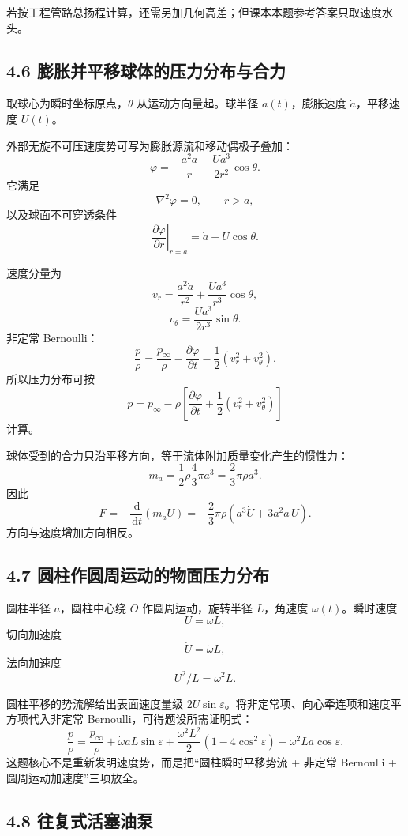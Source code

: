 \documentclass[UTF8,zihao=-4]{ctexart}
\newcommand{\dd}{\,\mathrm d}
\begin{document}
若按工程管路总扬程计算，还需另加几何高差；但课本本题参考答案只取速度水头。

\subsection*{4.6 膨胀并平移球体的压力分布与合力}

取球心为瞬时坐标原点，\(\theta\) 从运动方向量起。球半径 \(a(t)\)，膨胀速度 \(\dot a\)，平移速度 \(U(t)\)。

外部无旋不可压速度势可写为膨胀源流和移动偶极子叠加：
\[
\boxed{
\varphi
=-\frac{a^2\dot a}{r}
-\frac{U a^3}{2r^2}\cos\theta.}
\]
它满足
\[
\nabla^2\varphi=0,\qquad r>a,
\]
以及球面不可穿透条件
\[
\left.\frac{\partial\varphi}{\partial r}\right|_{r=a}
=\dot a+U\cos\theta.
\]

速度分量为
\[
v_r=\frac{a^2\dot a}{r^2}
+\frac{U a^3}{r^3}\cos\theta,
\]
\[
v_\theta=\frac{Ua^3}{2r^3}\sin\theta.
\]
非定常 Bernoulli：
\[
\frac{p}{\rho}
=\frac{p_\infty}{\rho}
-\frac{\partial\varphi}{\partial t}
-\frac12(v_r^2+v_\theta^2).
\]
所以压力分布可按
\[
\boxed{
p=p_\infty-\rho\left[
\frac{\partial\varphi}{\partial t}
+\frac12(v_r^2+v_\theta^2)\right]}
\]
计算。

球体受到的合力只沿平移方向，等于流体附加质量变化产生的惯性力：
\[
m_a=\frac12\rho\frac{4}{3}\pi a^3
=\frac23\pi\rho a^3.
\]
因此
\[
\boxed{
F=-\frac{\dd}{\dd t}(m_a U)
=-\frac23\pi\rho
\left(a^3\dot U+3a^2\dot a\,U\right).}
\]
方向与速度增加方向相反。

\subsection*{4.7 圆柱作圆周运动的物面压力分布}

圆柱半径 \(a\)，圆柱中心绕 \(O\) 作圆周运动，旋转半径 \(L\)，角速度 \(\omega(t)\)。瞬时速度
\[
U=\omega L,
\]
切向加速度
\[
\dot U=\dot\omega L,
\]
法向加速度
\[
U^2/L=\omega^2L.
\]

圆柱平移的势流解给出表面速度量级 \(2U\sin\varepsilon\)。将非定常项、向心牵连项和速度平方项代入非定常 Bernoulli，可得题设所需证明式：
\[
\boxed{
\frac{p}{\rho}
=\frac{p_\infty}{\rho}
+\dot\omega aL\sin\varepsilon
+\frac{\omega^2L^2}{2}(1-4\cos^2\varepsilon)
-\omega^2La\cos\varepsilon.}
\]
这题核心不是重新发明速度势，而是把“圆柱瞬时平移势流 + 非定常 Bernoulli + 圆周运动加速度”三项放全。

\subsection*{4.8 往复式活塞油泵}
\end{document}
